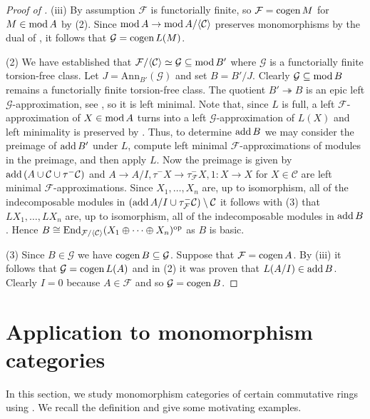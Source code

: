 \documentclass[a4paper]{amsart}
\newcommand{\op}{\textnormal{op}}
\renewcommand{\mod}{\textnormal{mod}\,}
\newcommand{\add}{\textnormal{add}\,}
\newcommand{\cogen}{\textnormal{cogen}\,}
\numberwithin{equation}{section} \theoremstyle{plain}
\numberwithin{thm}{section}
\begin{document}
\begin{proof}[Proof of ]
(iii) By assumption $\mathcal{F}$ is functorially finite, so $\mathcal{F} = \cogen M$ for $M\in \mod A$ by  (2). Since $\mod A \to \mod A /\langle \mathcal{C} \rangle$ preserves monomorphisms by the dual of \cite[Proposition 5.3 (3)]{enomoto}, it follows that $\mathcal{G} = \cogen L(M)$.

(2) We have established that $\mathcal{F}/\langle \mathcal{C} \rangle \simeq \mathcal{G} \subseteq \mod B'$ where $\mathcal{G}$ is a functorially finite torsion-free class. Let $J = \mathrm{Ann}_{B'}(\mathcal{G})$ and set $B = B'/J$. Clearly $\mathcal{G} \subseteq \mod B$ remains a functorially finite torsion-free class. The quotient $B' \twoheadrightarrow B$ is an epic left $\mathcal{G}$-approximation, see , so it is left minimal. Note that, since $L$ is full, a left $\mathcal{F}$-approximation of $X\in \mod A$ turns into a left $\mathcal{G}$-approximation of $L(X)$ and left minimality is preserved by . Thus, to determine $\add B$ we may consider the preimage of $\add B'$ under $L$, compute left minimal $\mathcal{F}$-approximations of modules in the preimage, and then apply $L$. Now the preimage is given by $\add (A\cup \mathcal{C} \cup \tau^- \mathcal{C})$ and $A\to A/I, \tau^- X \to \tau^-_\mathcal{F} X, 1\colon X \to X$ for $X\in \mathcal{C}$ are left minimal $\mathcal{F}$-approximations. Since $X_1, \dots , X_n$ are, up to isomorphism, all of the indecomposable modules in $(\add A/I \cup \tau_\mathcal{F}^- \mathcal{C}) \setminus \mathcal{C}$ it follows with  (3) that $L X_1, \dots, LX_n$ are, up to isomorphism, all of the indecomposable modules in $\add B$. Hence $B \cong \mathrm{End}_{\mathcal{F}/\langle \mathcal{C} \rangle} (X_1\oplus \dots \oplus X_n)^\op$ as $B$ is basic.

(3) Since $B \in \mathcal{G}$ we have $\cogen B \subseteq \mathcal{G}$. Suppose that $\mathcal{F} = \cogen A$. By (iii) it follows that $\mathcal{G} = \cogen L(A)$ and in (2) it was proven that $L(A/I) \in \add B$. Clearly $I = 0$ because $A \in \mathcal{F}$ and so $\mathcal{G} = \cogen B$.  
\end{proof}

\section{Application to monomorphism categories}

In this section, we study monomorphism categories of certain commutative rings using . We recall the definition and give some motivating examples.
\end{document}
